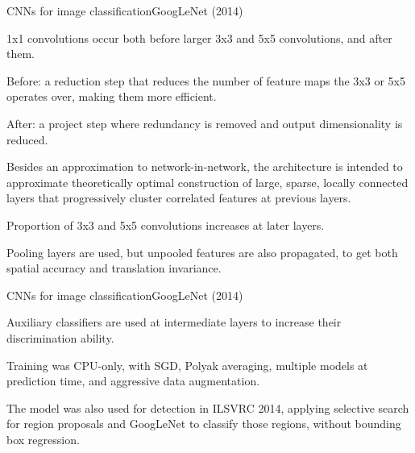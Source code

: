 \documentclass{beamer}
\begin{document}
\begin{frame}{CNNs for image classification}{GoogLeNet (2014)}

  1x1 convolutions occur both \alert{before} larger 3x3 and 5x5
  convolutions, and \alert{after} them.

  \medskip

  Before: a \alert{reduction} step that reduces the number of
  feature maps the 3x3 or 5x5 operates over, making them more
  efficient.

  \medskip
	
  After: a \alert{project} step where redundancy is removed
  and output dimensionality is reduced.

  \medskip

  Besides an approximation to network-in-network, the architecture
  is intended to approximate theoretically optimal construction of
  \alert{large, sparse, locally connected layers} that progressively
  cluster correlated features at previous layers.

  \medskip

  Proportion of 3x3 and 5x5 convolutions increases at later layers.

  \medskip

  Pooling layers are used, but unpooled features are also propagated,
  to get both spatial accuracy and translation invariance.

\end{frame}


\begin{frame}{CNNs for image classification}{GoogLeNet (2014)}

  Auxiliary classifiers are used at intermediate layers to increase
  their discrimination ability.

  \medskip

  Training was CPU-only, with SGD, Polyak averaging, multiple models
  at prediction time, and aggressive data augmentation.

  \medskip

  The model was also used for detection in ILSVRC 2014, applying selective
  search for region proposals and GoogLeNet to classify
  those regions, without bounding box regression.

\end{frame}
\end{document}
